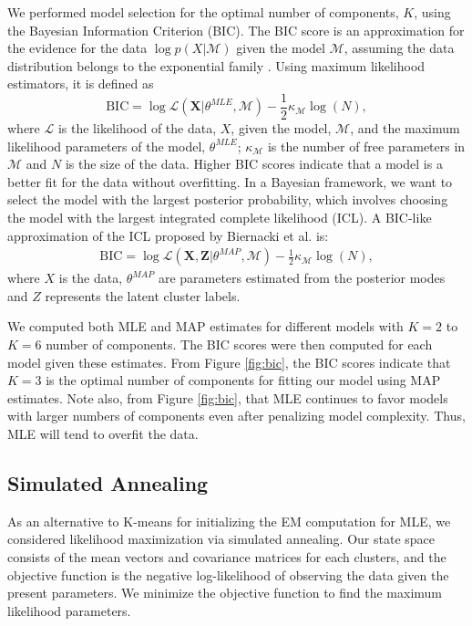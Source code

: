 \documentclass[twoside]{article}
\theoremstyle{theorem}
\theoremstyle{theorem}
\theoremstyle{theorem}
\theoremstyle{lemma}
\theoremstyle{definition}
\theoremstyle{example}
\begin{document}
We performed model selection for the optimal number of components, $K$, using the Bayesian Information Criterion (BIC). The BIC score is an approximation for the evidence for the data $\log p(X | \mathcal{M})$ given the model $\mathcal{M}$, assuming the data distribution belongs to the exponential family \cite{Bishop}. Using maximum likelihood estimators, it is defined as 
\begin{equation}
\mathrm{BIC} = \log\mathcal{L}(\mathbf{X} | \theta^{MLE}, \mathcal{M}) - \frac{1}{2} \kappa_\mathcal{M}  \log(N),
\end{equation}
where $\mathcal{L}$ is the likelihood of the data, $X$, given the model, $\mathcal{M}$, and the maximum likelihood parameters of the model, $\theta^{MLE}$; $\kappa_\mathcal{M}$ is the number of free parameters in $\mathcal{M}$ and $N$ is the size of the data. Higher BIC scores indicate that a model is a better fit for the data without overfitting. In a Bayesian framework, we want to select the model with the largest posterior probability, which involves choosing the model with the largest integrated complete likelihood (ICL). A BIC-like approximation of the ICL proposed by Biernacki et al. \cite{Biernacki} is: 
\begin{align}
\mathrm{BIC} = \log \mathcal{L}(\mathbf{X}, \mathbf{Z} | \theta^{MAP},  \mathcal{M}) -  \frac{1}{2} \kappa_\mathcal{M} \log(N),
\end{align}
where $X$ is the data, $\theta^{MAP}$ are parameters estimated from the posterior modes and $Z$ represents the latent cluster labels. 

We computed both MLE and MAP estimates for different models with $K=2$ to $K=6$ number of components. The BIC scores were then computed for each model given these estimates. From Figure \ref{fig:bic}, the BIC scores indicate that $K = 3$ is the optimal number of components for fitting our model using MAP estimates. Note also, from Figure \ref{fig:bic}, that MLE continues to favor models with larger numbers of components even after penalizing model complexity. Thus, MLE will tend to overfit the data.

\subsection{Simulated Annealing}
As an alternative to K-means for initializing the EM computation for MLE, we considered likelihood maximization via simulated annealing.  Our state space consists of the mean vectors and covariance matrices for each clusters, and the objective function is the negative log-likelihood of observing the data given the present parameters. We minimize the objective function to find the maximum likelihood parameters.
\end{document}
